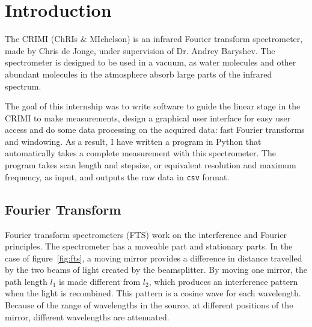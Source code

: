 
\section{Introduction}
The CRIMI (ChRIs $\&$ MIchelson) is an infrared Fourier transform spectrometer, made by Chris de Jonge, under supervision of Dr. Andrey Baryshev. The spectrometer is designed to be used in a vacuum, as water molecules and other abundant molecules in the atmosphere absorb large parts of the infrared spectrum.

The goal of this internship was to write software to guide the linear stage in the CRIMI to make measurements, design a graphical user interface for easy user access and do some data processing on the acquired data: fast Fourier transforms and windowing. As a result, I have written a program in Python that automatically takes a complete measurement with this spectrometer. The program takes scan length and stepsize, or equivalent resolution and maximum frequency, as input, and outputs the raw data in \verb!csv! format.


\subsection{Fourier Transform}

Fourier transform spectrometers (FTS) work on the interference and Fourier principles. The spectrometer has a moveable part and stationary parts. In the case of figure~\ref{fig:fts}, a moving mirror provides a difference in distance travelled by the two beams of light created by the beamsplitter. By moving one mirror, the path length $l_1$ is made different from $l_2$, which produces an interference pattern when the light is recombined. This pattern is a cosine wave for each wavelength. Because of the range of wavelengths in the source, at different positions of the mirror, different wavelengths are attenuated.

